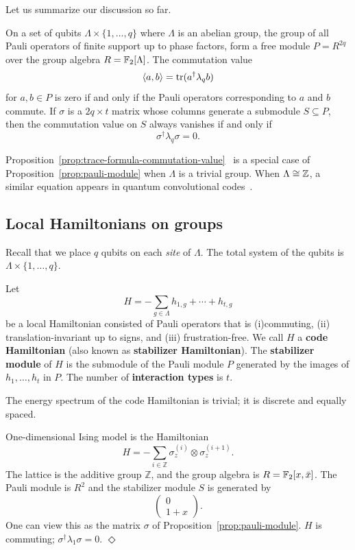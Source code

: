Let us summarize our discussion so far.
\begin{prop}
On a set of qubits $\Lambda \times \{1,\ldots,q\}$ where $\Lambda$ is an abelian group,
the group of all Pauli operators of finite support up to phase factors,
form a free module $P=R^{2q}$ over the group algebra $R = \mathbb{F}_2[\Lambda]$.
The commutation value
\[ 
 \langle a, b \rangle = \mathop{\mathrm{tr}}\nolimits( a^\dagger \lambda_q b )
\]
for $a,b \in P$ is zero
if and only if the Pauli operators corresponding to $a$ and $b$ commute.
If $\sigma$ is a $2q \times t$ matrix whose columns generate a submodule $S \subseteq P$,
then the commutation value on $S$ always vanishes if and only if
\[
 \sigma^\dagger \lambda_q \sigma = 0 .
\]
\label{prop:pauli-module}
\end{prop}
Proposition~\ref{prop:trace-formula-commutation-value}~\cite{CalderbankRainsShorEtAl1997Quantum}
is a special case of Proposition~\ref{prop:pauli-module} when $\Lambda$ is a trivial group.
When $\Lambda \cong \mathbb{Z}$, a similar equation appears in quantum convolutional 
codes~\cite{OllivierTillich2004Convolutional}.


\subsection{Local Hamiltonians on groups}

Recall that we place $q$ qubits on each {\em site} of $\Lambda$.
The total system of the qubits is $\Lambda \times \{1,\ldots,q\}$.
\begin{defn}
Let
\[
 H = -\sum_{g \in \Lambda} h_{1,g} + \cdots + h_{t,g}
\]
be a local Hamiltonian consisted of Pauli operators that is (i)commuting, (ii) translation-invariant up to signs, and (iii) frustration-free.
We call $H$ a {\bf code Hamiltonian} (also known as {\bf stabilizer Hamiltonian}).
The {\bf stabilizer module} of $H$ is the submodule of the Pauli module $P$
generated by the images of $h_1,\ldots,h_t$ in $P$.
The number of {\bf interaction types} is $t$.
\end{defn}
The energy spectrum of the code Hamiltonian is trivial;
it is discrete and equally spaced.

\begin{example}
One-dimensional Ising model is the Hamiltonian
\[
 H = - \sum_{i \in \mathbb{Z}} \sigma_z^{(i)} \otimes \sigma_z^{(i+1)} .
\]
The lattice is the additive group $\mathbb{Z}$,
and the group algebra is $R=\mathbb{F}_2[x,\bar x]$.
The Pauli module is $R^2$ and the stabilizer module $S$ is generated by
\[
\begin{pmatrix}
 0 \\
 1+x
\end{pmatrix} .
\]
One can view this as the matrix $\sigma$ of Proposition~\ref{prop:pauli-module}.
$H$ is commuting; $\sigma^\dagger \lambda_1 \sigma = 0$.
\hfill $\Diamond$
\label{eg:1d-ising}
\end{example}


